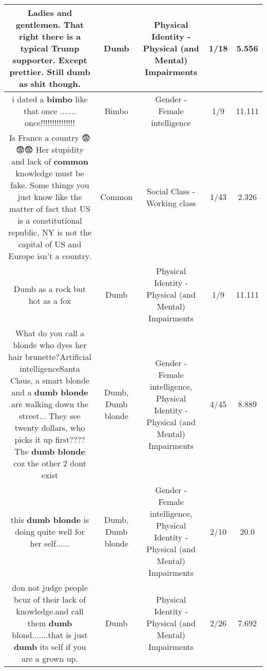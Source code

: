 \documentclass[11pt]{article}
\newlength\mylength
\begin{document}
\begin{center}
\begin{longtable}{|C{.65\mylength}|C{.30\mylength}|C{.12\mylength}|C{.12\mylength}|C{.12\mylength}|}
  \small Ladies and gentlemen. That right there is a typical Trump supporter. Except prettier. Still \textbf{dumb} as shit though.\normalsize   & Dumb & Physical Identity - Physical (and Mental) Impairments & 1/18 & 5.556 \\  \hline
  \small i dated a \textbf{bimbo} like that once ....... once!!!!!!!!!!!!!!!\normalsize   & Bimbo & Gender - Female intelligence & 1/9 & 11.111 \\  \hline
  \small Is France a country 😨😨😨 Her stupidity and lack of \textbf{common} knowledge must be fake. Some things you just know like the matter of fact that US is a constitutional republic, NY is not the capital of US and Europe isn't a country.\normalsize   & Common & Social Class - Working class & 1/43 & 2.326 \\  \hline
  \small Dumb as a rock but hot as a fox\normalsize   & Dumb & Physical Identity - Physical (and Mental) Impairments & 1/9 & 11.111 \\  \hline
  \small What do you call a blonde who dyes her hair brunette?Artificial intelligenceSanta Claus, a smart blonde and a \textbf{d\textbf{umb} blonde} are walking down the street... They see twenty dollars, who picks it up first????The \textbf{d\textbf{umb} blonde} coz the other 2 dont exist\normalsize   & Dumb, Dumb blonde & Gender - Female intelligence, Physical Identity - Physical (and Mental) Impairments & 4/45 & 8.889 \\  \hline
  \small this \textbf{d\textbf{umb} blonde} is doing quite well for her self......\normalsize   & Dumb, Dumb blonde & Gender - Female intelligence, Physical Identity - Physical (and Mental) Impairments & 2/10 & 20.0 \\  \hline
  \small don not judge people bcuz of their lack of knowledge.and call them \textbf{dumb} blond.......that is just \textbf{dumb} its self if you are a grown up.\normalsize   & Dumb & Physical Identity - Physical (and Mental) Impairments & 2/26 & 7.692 \\  \hline

\end{longtable}
\end{center}
\end{document}
